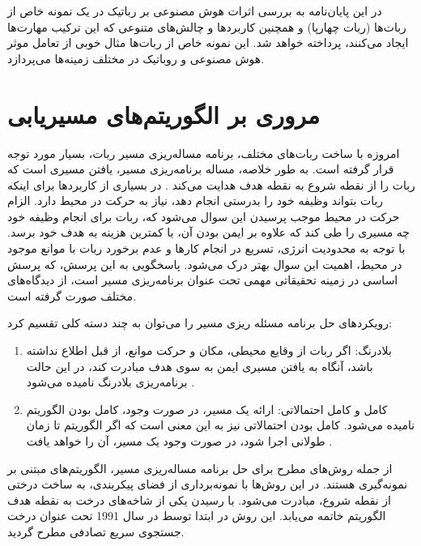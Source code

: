 در این پایان‌نامه به بررسی اثرات هوش مصنوعی بر رباتیک در یک نمونه خاص از ربات‌ها (ربات چهارپا) و همچنین کاربردها و چالش‌های متنوعی که این ترکیب مهارت‌ها ایجاد می‌کنند، پرداخته خواهد شد. این نمونه خاص‌ از ربات‌ها مثال خوبی از تعامل موثر هوش مصنوعی و روباتیک در مختلف زمینه‌ها می‌پردازد.

\section{مروری بر الگوریتم‌های مسیریابی}\label{مروری بر الگوریتم‌های مسیریابی}

امروزه با ساخت ربات‌های مختلف، برنامه مساله‌ریزی مسیر ربات، بسیار
مورد توجه قرار گرفته است. به طور خلاصه، مساله برنامه‌ریزی مسیر،
یافتن مسیری است که ربات را از نقطه شروع به نقطه هدف هدایت
می‌کند
\cite{irscholar20727638}.
در بسیاری از کاربردها برای اینکه ربات بتواند وظیفه خود را
بدرستی انجام دهد، نیاز به حرکت در محیط دارد. الزام حرکت در محیط موجب پرسیدن این سوال می‌شود که، ربات برای انجام وظیفه خود چه مسیری را طی کند که علاوه بر ایمن بودن آن، با کمترین هزینه به هدف خود برسد. با توجه به محدودیت انرژی، تسریع در انجام کارها و عدم
برخورد ربات با موانع موجود در محیط، اهمیت این سوال بهتر درک می‌شود. پاسخگویی به این پرسش، که پرسش اساسی در زمینه تحقیقاتی مهمی تحت عنوان برنامه‌ریزی مسیر است، از دیدگاه‌های مختلف صورت گرفته است.

رویکردهای حل برنامه مسئله ریزی مسیر را می‌توان به چند دسته کلی تقسیم کرد:
\begin{enumerate}
	\item
	بلادرنگ: اگر ربات از وقایع محیطی، مکان و حرکت موانع، از قبل اطلاع نداشته باشد، آنگاه به یافتن مسیری ایمن به سوی هدف مبادرت کند، در این حالت برنامه‌ریزی بلادرنگ نامیده می‌شود
	\cite{irscholar20727638}.
	\item
	کامل و کامل احتمالاتی: ارائه یک مسیر، در صورت وجود، کامل بودن
	الگوریتم نامیده می‌شود. کامل بودن احتمالاتی نیز به این معنی است که اگر الگوریتم تا زمان طولانی اجرا شود، در صورت وجود یک مسیر، آن را خواهد یافت
	\cite{irscholar20727638}.
	
\end{enumerate}

از جمله روش‌های مطرح برای حل برنامه مساله‌ریزی مسیر،
الگوریتم‌های مبتنی بر نمونه‌گیری هستند. در این روش‌ها با نمونه‌برداری از فضای پیکربندی، به ساخت درختی از نقطه شروع، مبادرت می‌شود. با رسیدن یکی از شاخه‌های درخت به نقطه هدف الگوریتم خاتمه می‌یابد.
این روش در ابتدا توسط
در سال 1991 تحت عنوان درخت جستجوی سریع تصادفی
مطرح گردید.

